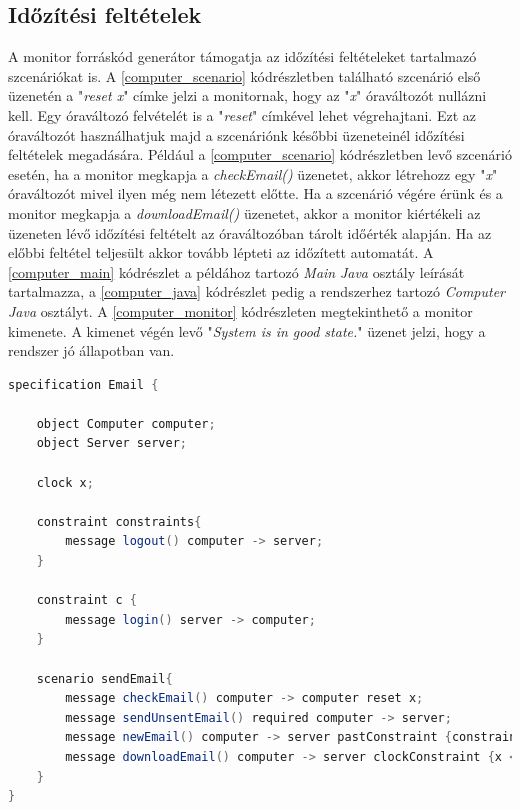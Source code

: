 \subsection{Időzítési feltételek}

A monitor forráskód generátor támogatja az időzítési feltételeket tartalmazó szcenáriókat is.
A \ref{computer_scenario} kódrészletben található szcenárió első üzenetén a "\textit{reset x}" címke jelzi a monitornak, hogy az "\textit{x}" óraváltozót nullázni kell.
Egy óraváltozó felvételét is a "\textit{reset}" címkével lehet végrehajtani.
Ezt az óraváltozót használhatjuk majd a szcenáriónk későbbi üzeneteinél időzítési feltételek megadására.
Például a \ref{computer_scenario} kódrészletben levő szcenárió esetén, ha a monitor megkapja a \textit{checkEmail()} üzenetet, akkor létrehozz egy "\textit{x}" óraváltozót mivel ilyen még nem létezett előtte.
Ha a szcenárió végére érünk és a monitor megkapja a \textit{downloadEmail()} üzenetet, akkor a monitor kiértékeli az üzeneten lévő időzítési feltételt az óraváltozóban tárolt időérték alapján.
Ha az előbbi feltétel teljesült akkor tovább lépteti az időzített automatát.
A \ref{computer_main} kódrészlet a példához tartozó \textit{Main} \textit{Java} osztály leírását tartalmazza, a \ref{computer_java} kódrészlet pedig a rendszerhez tartozó \textit{Computer} \textit{Java} osztályt.
A \ref{computer_monitor} kódrészleten megtekinthető a monitor kimenete.
A kimenet végén levő "\textit{System is in good state.}" üzenet jelzi, hogy a rendszer jó állapotban van.

\begin{lstlisting}[language=java, frame=single, float=ht!, caption={Időzítési feltételeket tartalmazó szcenárió},captionpos=b,label=computer_scenario]
specification Email {

	object Computer computer;
	object Server server;

	clock x;

	constraint constraints{
		message logout() computer -> server;
	}

	constraint c {
		message login() server -> computer;
	}

	scenario sendEmail{
		message checkEmail() computer -> computer reset x;
		message sendUnsentEmail() required computer -> server;
		message newEmail() computer -> server pastConstraint {constraints};
		message downloadEmail() computer -> server clockConstraint {x < 10};
	}
}
\end{lstlisting}

